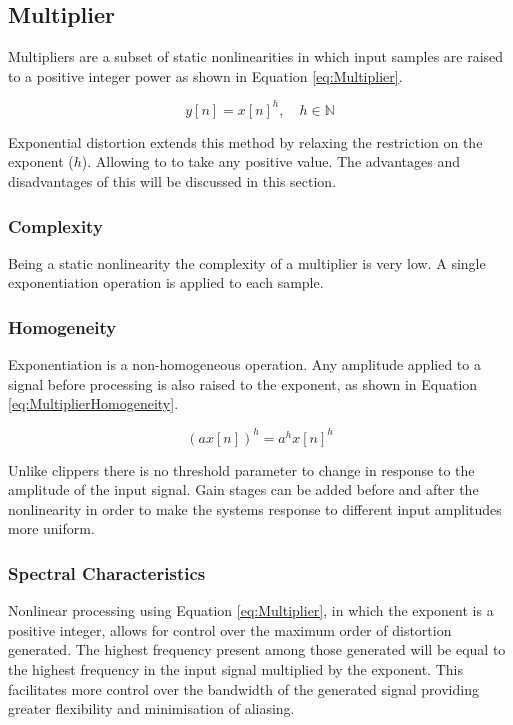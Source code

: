 	\subsection{Multiplier}
	\label{sec:Excitation-Multiplier}
		Multipliers are a subset of static nonlinearities in which input samples are raised to a positive integer
		power as shown in Equation \ref{eq:Multiplier}.

		\begin{equation}
			y[n] = x[n]^{h}, \quad h \in \mathbb{N}
			\label{eq:Multiplier}
		\end{equation}

		Exponential distortion extends this method by relaxing the restriction on the exponent ($h$). Allowing to
		to take any positive value. The advantages and disadvantages of this will be discussed in this section.

		\subsubsection*{Complexity}
			Being a static nonlinearity the complexity of a multiplier is very low. A single exponentiation
			operation is applied to each sample. 

		\subsubsection*{Homogeneity}
			Exponentiation is a non-homogeneous operation. Any amplitude applied to a signal before processing
			is also raised to the exponent, as shown in Equation \ref{eq:MultiplierHomogeneity}.

			\begin{equation}
				(ax[n])^{h} = a^{h}x[n]^{h}
				\label{eq:MultiplierHomogeneity}
			\end{equation}

			Unlike clippers there is no threshold parameter to change in response to the amplitude of the input
			signal. Gain stages can be added before and after the nonlinearity in order to make the systems
			response to different input amplitudes more uniform.
			
		\subsubsection*{Spectral Characteristics}
			Nonlinear processing using Equation \ref{eq:Multiplier}, in which the exponent is a positive
			integer, allows for control over the maximum order of distortion generated. The highest frequency
			present among those generated will be equal to the highest frequency in the input signal multiplied
			by the exponent. This facilitates more control over the bandwidth of the generated signal providing
			greater flexibility and minimisation of aliasing.

